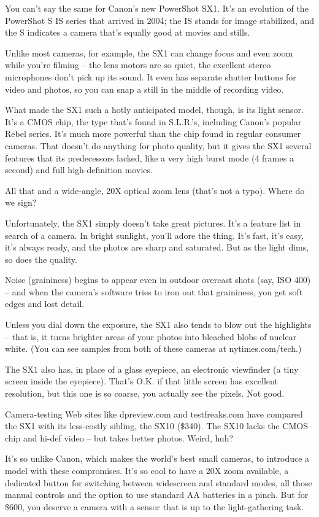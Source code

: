 \documentclass[12pt,a4paper,onecolumn]{article}
\begin{document}
You can't say the same for Canon's new PowerShot SX1. It's an evolution of the PowerShot S IS series
that arrived in 2004; the IS stands for image stabilized, and the S indicates a camera that's
equally good at movies and stills.

Unlike most cameras, for example, the SX1 can change focus and even zoom while you're filming -- the
lens motors are so quiet, the excellent stereo microphones don't pick up its sound. It even has
separate shutter buttons for video and photos, so you can snap a still in the middle of recording
video.

What made the SX1 such a hotly anticipated model, though, is its light sensor. It's a CMOS chip, the
type that's found in S.L.R.'s, including Canon's popular Rebel series. It's much more powerful than
the chip found in regular consumer cameras. That doesn't do anything for photo quality, but it gives
the SX1 several features that its predecessors lacked, like a very high burst mode (4 frames a
second) and full high-definition movies.

All that and a wide-angle, 20X optical zoom lens (that's not a typo). Where do we sign?

Unfortunately, the SX1 simply doesn't take great pictures. It's a feature list in search of a
camera. In bright sunlight, you'll adore the thing. It's fast, it's easy, it's always ready, and the
photos are sharp and saturated. But as the light dims, so does the quality.

Noise (graininess) begins to appear even in outdoor overcast shots (say, ISO 400) -- and when the
camera's software tries to iron out that graininess, you get soft edges and lost detail.

Unless you dial down the exposure, the SX1 also tends to blow out the highlights -- that is, it
turns brighter areas of your photos into bleached blobs of nuclear white. (You can see samples from
both of these cameras at nytimes.com/tech.)

The SX1 also has, in place of a glass eyepiece, an electronic viewfinder (a tiny screen inside the
eyepiece). That's O.K. if that little screen has excellent resolution, but this one is so coarse,
you actually see the pixels. Not good.

Camera-testing Web sites like dpreview.com and testfreaks.com have compared the SX1 with its
less-costly sibling, the SX10 (\$340). The SX10 lacks the CMOS chip and hi-def video -- but takes
better photos. Weird, huh?

It's so unlike Canon, which makes the world's best small cameras, to introduce a model with these
compromises. It's so cool to have a 20X zoom available, a dedicated button for switching between
widescreen and standard modes, all those manual controls and the option to use standard AA batteries
in a pinch. But for \$600, you deserve a camera with a sensor that is up to the light-gathering
task.
\end{document}

